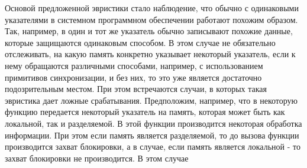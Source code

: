 Основой предложенной эвристики стало наблюдение, что обычно с одинаковыми указателями в системном программном обеспечении работают похожим образом.
Так, например, в один и тот же указатель обычно записывают похожие данные, которые защищаются одинаковым способом.
В этом случае не обязательно отслеживать, на какую память конкретно указывает некоторый указатель, если к нему обращаются различными способами, например, с использованием примитивов синхронизации, и без них, то это уже является достаточно подозрительным местом.
При этом встречаются случаи, в которых такая эвристика дает ложные срабатывания. 
Предположим, например, что в некоторую функцию передается некоторый указатель на память, которая может быть как локальной, так и разделяемой. 
В этой функции производится некоторая обработка информации. При этом если память является разделяемой, то до вызова функции производится захват блокировки, а в случае, если память является локальной - то захват блокировки не производится.
В этом случае 

